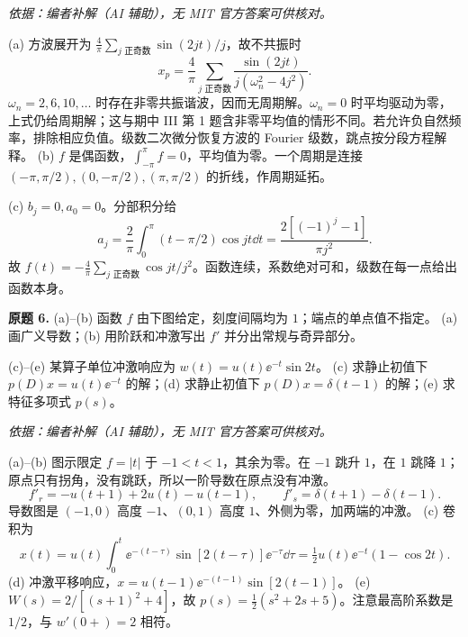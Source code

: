 \begin{solution}
\textit{依据：编者补解（AI 辅助），无 MIT 官方答案可供核对。}\par
(a) 方波展开为 $\tfrac4\pi\sum_{j\text{ 正奇数}}\sin(2jt)/j$，故不共振时
\[x_p=\frac4\pi\sum_{j\text{ 正奇数}}\frac{\sin(2jt)}{j(\omega_n^2-4j^2)}.\]
$\omega_n=2,6,10,\ldots$ 时存在非零共振谐波，因而无周期解。$\omega_n=0$ 时平均驱动为零，上式仍给周期解；这与期中 III 第 1 题含非零平均值的情形不同。若允许负自然频率，排除相应负值。级数二次微分恢复方波的 Fourier 级数，跳点按分段方程解释。
(b) $f$ 是偶函数，$\int_{-\pi}^{\pi}f=0$，平均值为零。一个周期是连接 $(-\pi,\pi/2),(0,-\pi/2),(\pi,\pi/2)$ 的折线，作周期延拓。
\begin{center}\end{center}
(c) $b_j=0,a_0=0$。分部积分给
\[a_j=\frac2\pi\int_0^\pi(t-\pi/2)\cos jt\dd t=\frac{2[(-1)^j-1]}{\pi j^2}.\]
故 $f(t)=-\tfrac4\pi\sum_{j\text{ 正奇数}}\cos jt/j^2$。函数连续，系数绝对可和，级数在每一点给出函数本身。
\end{solution}
\begin{exercise}\label{cw:final-6}\textbf{原题 6.}
(a)--(b) 函数 $f$ 由下图给定，刻度间隔均为 $1$；端点的单点值不指定。
(a) 画广义导数；(b) 用阶跃和冲激写出 $f'$ 并分出常规与奇异部分。
\begin{center}\end{center}
(c)--(e) 某算子单位冲激响应为 $w(t)=u(t)\ee^{-t}\sin2t$。
(c) 求静止初值下 $p(D)x=u(t)\ee^{-t}$ 的解；(d) 求静止初值下 $p(D)x=\delta(t-1)$ 的解；(e) 求特征多项式 $p(s)$。
\end{exercise}
\begin{solution}
\textit{依据：编者补解（AI 辅助），无 MIT 官方答案可供核对。}\par
(a)--(b) 图示限定 $f=|t|$ 于 $-1<t<1$，其余为零。在 $-1$ 跳升 $1$，在 $1$ 跳降 $1$；原点只有拐角，没有跳跃，所以一阶导数在原点没有冲激。
\[f'_r=-u(t+1)+2u(t)-u(t-1),\qquad f'_s=\delta(t+1)-\delta(t-1).\]
导数图是 $(-1,0)$ 高度 $-1$、$(0,1)$ 高度 $1$、外侧为零，加两端的冲激。\ODEExamVDerivative
(c) 卷积为
\[x(t)=u(t)\int_0^t\ee^{-(t-\tau)}\sin[2(t-\tau)]\ee^{-\tau}\dd\tau
=\tfrac12u(t)\ee^{-t}(1-\cos2t).\]
(d) 冲激平移响应，$x=u(t-1)\ee^{-(t-1)}\sin[2(t-1)]$。
(e) $W(s)=2/[(s+1)^2+4]$，故 $p(s)=\tfrac12(s^2+2s+5)$。注意最高阶系数是 $1/2$，与 $w'(0+)=2$ 相符。
\end{solution}
